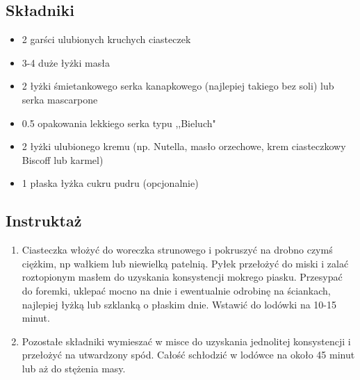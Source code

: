 \documentclass[a4paper,10pt]{book}
\begin{document}
\begin{multicols}{2}

\subsection*{Składniki}
\begin{itemize}
    \item 2 garści ulubionych kruchych ciasteczek 
    \item 3-4 duże łyżki masła
    \item 2 łyżki śmietankowego serka kanapkowego (najlepiej takiego bez soli) lub serka mascarpone
    \item 0.5 opakowania lekkiego serka typu ,,Bieluch"
    \item 2 łyżki ulubionego kremu (np. Nutella, masło orzechowe, krem ciasteczkowy Biscoff lub karmel)
    \item 1 płaska łyżka cukru pudru (opcjonalnie)
\end{itemize}

\columnbreak

\begin{figure}[H]
    \centering
\end{figure}
\end{multicols}

\vspace{0.5cm} 

\subsection*{Instruktaż}
\begin{enumerate}
    \item Ciasteczka włożyć do woreczka strunowego i pokruszyć na drobno czymś ciężkim, np wałkiem lub niewielką patelnią. Pyłek przełożyć do miski i zalać roztopionym masłem do uzyskania konsystencji mokrego piasku. Przesypać do foremki, uklepać mocno na dnie i ewentualnie odrobinę na ściankach, najlepiej łyżką lub szklanką o płaskim dnie. Wstawić do lodówki na 10-15 minut.
    \item Pozostałe składniki wymieszać w misce do uzyskania jednolitej konsystencji i przełożyć na utwardzony spód. Całość schłodzić w lodówce na około 45 minut lub aż do stężenia masy.
\end{enumerate}
\end{document}
